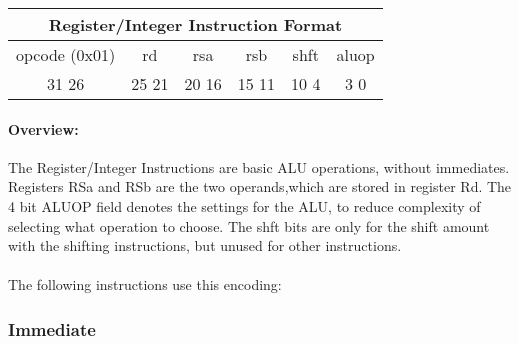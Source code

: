 \documentclass[letterpaper, 11pt]{article}
\begin{document}
\begin{center}
		\begin{tabular}{|c|c|c|c|c|c|}
			\multicolumn{6}{c}{Register/Integer Instruction Format}\\ \hline
				\hspace{2pt} opcode (0x01) \hspace{2pt} & \hspace{5pt} rd \hspace{5pt} &  \hspace{4pt} rsa \hspace{4pt} & \hspace{4pt}rsb  \hspace{4pt}& \hspace{10pt}shft  \hspace{10pt} & \hspace{3pt} aluop \hspace{3pt}   \\	\hline
			31 \hfill 26& 25 \hfill 21 &20 \hfill  16& 15 \hfill  11&10 \hfill   4&3 \hfill   0\\ \hline
		
	\end{tabular}
\end{center}	
\paragraph{Overview:}The Register/Integer Instructions are basic ALU operations, without immediates. Registers RSa and RSb are the two operands,which
are stored in register Rd. The 4 bit ALUOP field denotes the settings for the ALU, to reduce complexity of selecting what operation to choose.
The shft bits are only for the shift amount with the shifting instructions, but unused for other instructions. 
\paragraph{}The following instructions use this encoding:



\subsubsection{Immediate}
\end{document}
